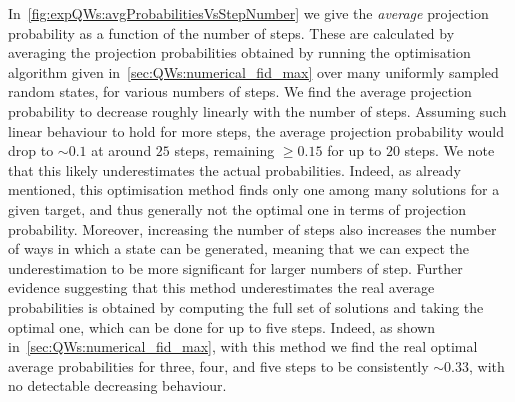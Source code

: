 In~\cref{fig:expQWs:avgProbabilitiesVsStepNumber} we give the \textit{average} projection probability as a function of the number of steps. These are calculated by averaging the projection probabilities obtained by running the optimisation algorithm given in~\cref{sec:QWs:numerical_fid_max} over many uniformly sampled random states, for various numbers of steps. We find the average projection probability to decrease roughly linearly with the number of steps. Assuming such linear behaviour to hold for more steps, the average projection probability would drop to $\sim 0.1$ at around $25$ steps, remaining $\ge 0.15$ for up to $20$ steps.
We note that this likely underestimates the actual probabilities. Indeed, as already mentioned, this optimisation method finds only one among many solutions for a given target, and thus generally not the optimal one in terms of projection probability. Moreover, increasing the number of steps also increases the number of ways in which a state can be generated, meaning that we can expect the underestimation to be more significant for larger numbers of step.
Further evidence suggesting that this method underestimates the real average probabilities is obtained by computing the full set of solutions and taking the optimal one, which can be done for up to five steps. Indeed, as shown in~\cref{sec:QWs:numerical_fid_max}, with this method we find the real optimal average probabilities for three, four, and five steps to be consistently $\sim 0.33$, with no detectable decreasing behaviour.

